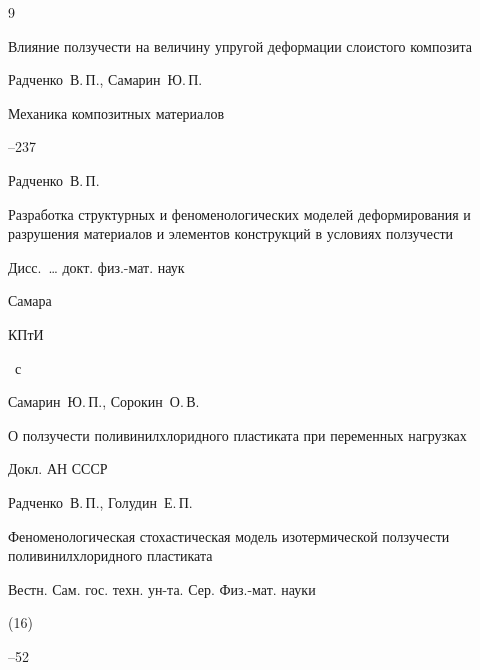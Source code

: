 \begin{thebibliography}{9}




\paper  Влияние ползучести на величину упругой деформации слоистого композита

\by   Радченко~В.\,П., Самарин~Ю.\,П.

\jour Механика композитных материалов



--237




\by Радченко~В.\,П.

\book  Разработка структурных и феноменологических моделей деформирования и разрушения материалов и элементов конструкций в условиях ползучести

\bookinfo Дисс.~{\ldots} докт. физ.-мат. наук

\publaddr Самара

\publ КПтИ


~с




\by Самарин~Ю.\,П., Сорокин~О.\,В.

\paper О ползучести поливинилхлоридного пластиката при переменных нагрузках

\jour  Докл. АН СССР








\by Радченко~В.\,П., Голудин~Е.\,П.

\paper  Феноменологическая стохастическая модель изотермической ползучести поливинилхлоридного пластиката

\jour  Вестн. Сам. гос. техн. ун-та. Сер. Физ.-мат. науки


(16)

--52







\end{thebibliography}

